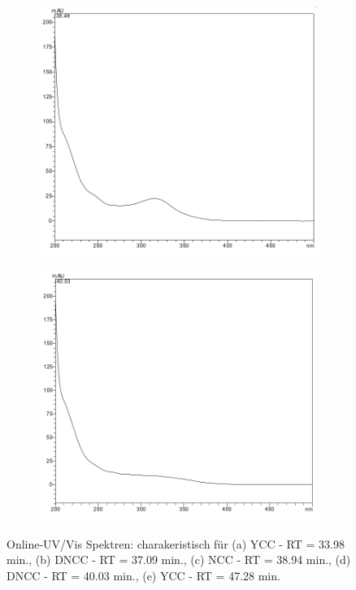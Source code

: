 \begin{figure}[!htbp]
  \begin{subfigure}[b]{0.5\textwidth}
    \includegraphics[width=\textwidth]{figures/Kapitel6/Reaktion3h/NCC3849.png}
    \caption{}
    \label{fig:NCC3849}
  \end{subfigure}
  \hfill
  \begin{subfigure}[b]{0.5\textwidth}
    \includegraphics[width=\textwidth]{figures/Kapitel6/Reaktion3h/DNCC4003.png}
    \caption{}
    \label{fig:DNCC4003}
  \end{subfigure}
  \caption[Online-UV/Vis Spektren mit der Charakteristik eines YCC bei 33.98 min., eines DNCC bei 37.09 min. eines NCC bei 38.94 min. sowie eines DNCC bei 40.03 min., Quelle: Autor]{Online-UV/Vis Spektren: charakeristisch für (a) \gls{YCC} - RT = 33.98 min., (b) \gls{DNCC} - RT = 37.09 min., (c) \gls{NCC} - RT = 38.94 min., (d) \gls{DNCC} - RT = 40.03 min., (e) \gls{YCC} - RT = 47.28 min.}
\end{figure}


